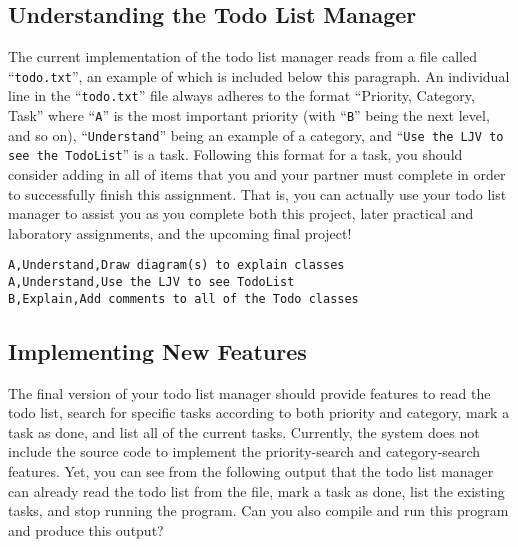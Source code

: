 

\vspace{-0.1in}
\subsection*{Understanding the Todo List Manager}
\vspace{-0.05in}

The current implementation of the todo list manager reads from a file called ``{\tt todo.txt}'', an example of which is
included below this paragraph. An individual line in the ``{\tt todo.txt}'' file always adheres to the format
``Priority, Category, Task'' where ``{\tt A}'' is the most important priority (with ``{\tt B}'' being the next level,
and so on), ``{\tt Understand}'' being an example of a category, and ``{\tt Use the LJV to see the TodoList}'' is a
task.  Following this format for a task, you should consider adding in all of items that you and your partner must
complete in order to successfully finish this assignment. That is, you can actually use your todo list manager to assist
you as you complete both this project, later practical and laboratory assignments, and the upcoming final project!

\vspace{-0.1in}
\begin{verbatim}
A,Understand,Draw diagram(s) to explain classes
A,Understand,Use the LJV to see TodoList
B,Explain,Add comments to all of the Todo classes
\end{verbatim}
\vspace{-0.1in}

\vspace{-0.15in}
\subsection*{Implementing New Features}
\vspace{-0.05in}

The final version of your todo list manager should provide features to read the todo list, search for specific tasks
according to both priority and category, mark a task as done, and list all of the current tasks.  Currently, the system
does not include the source code to implement the priority-search and category-search features. Yet, you can see
from the following output that the todo list manager can already read the todo list from the file, mark a task as done,
list the existing tasks, and stop running the program. Can you also compile and run this program and produce this
output?

